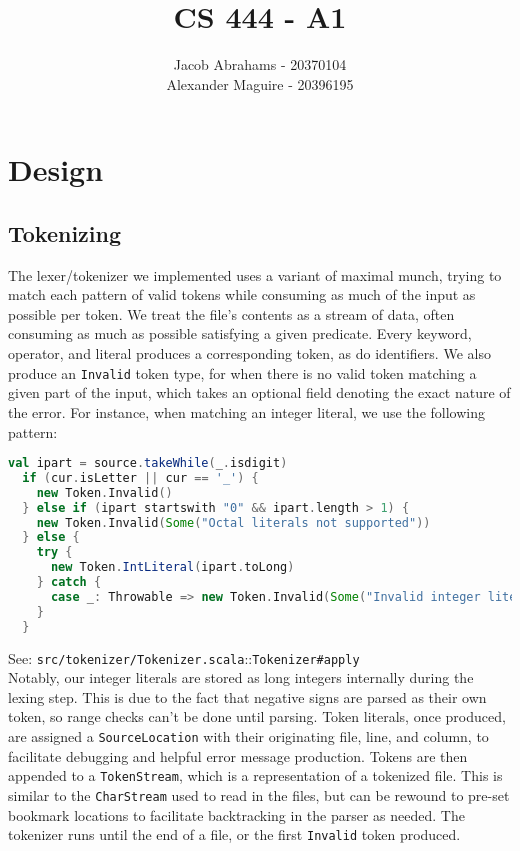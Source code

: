 \documentclass{article}
\title{CS 444 - A1}
\author{Jacob Abrahams - 20370104\\ Alexander Maguire - 20396195}
\begin{document}
\newcommand\type[1]{\texttt{#1}}
\newcommand\func[1]{\texttt{#1}}
\renewcommand\value[1]{\texttt{#1}}
\newcommand\source[2]{See: \texttt{src/#1.scala}::\type{#2} \\}
\newcommand\testsrc[1]{See: \texttt{test/#1.scala} \\}

\maketitle

\section{Design}

\subsection{Tokenizing}
The lexer/tokenizer we implemented uses a variant of maximal munch, trying to match each pattern of valid tokens while
consuming as much of the input as possible per token. We treat the file's contents as a stream of data, often consuming
as much as possible satisfying a given predicate. Every keyword, operator, and literal produces a corresponding token,
as do identifiers. We also produce an {\tt Invalid} token type, for when there is no valid token matching a given part
of the input, which takes an optional field denoting the exact nature of the error. For instance, when matching an
integer literal, we use the following pattern:

\begin{lstlisting}[language=Scala]
  val ipart = source.takeWhile(_.isdigit)
  if (cur.isLetter || cur == '_') {
    new Token.Invalid()
  } else if (ipart startswith "0" && ipart.length > 1) {
    new Token.Invalid(Some("Octal literals not supported"))
  } else {
    try {
      new Token.IntLiteral(ipart.toLong)
    } catch {
      case _: Throwable => new Token.Invalid(Some("Invalid integer literal "+ ipart))
    }
  }
\end{lstlisting}

\source{tokenizer/Tokenizer}{Tokenizer\#apply}

Notably, our integer literals are stored as long integers internally during the lexing step. This is due to the fact
that negative signs are parsed as their own token, so range checks can't be done until parsing. Token literals, once
produced, are assigned a {\tt SourceLocation} with their originating file, line, and column, to facilitate debugging and
helpful error message production. Tokens are then appended to a {\tt TokenStream}, which is a representation of a
tokenized file. This is similar to the {\tt CharStream} used to read in the files, but can be rewound to pre-set
bookmark locations to facilitate backtracking in the parser as needed. The tokenizer runs until the end of a file, or
the first {\tt Invalid} token produced.
\end{document}

